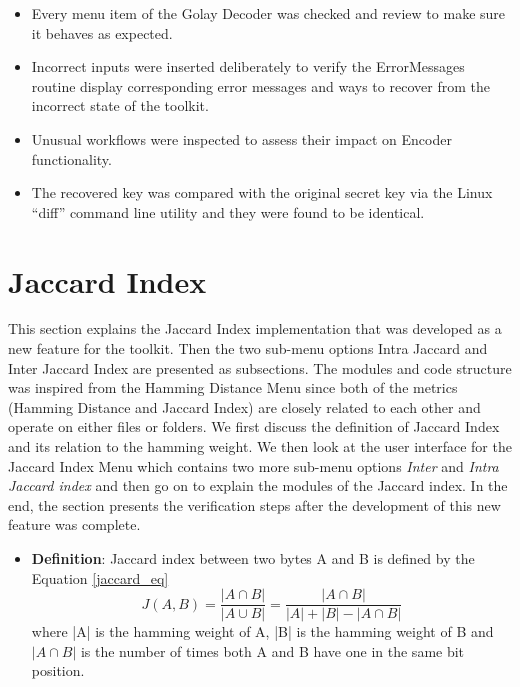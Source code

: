 	\begin{itemize}\itemsep-\the\parsep
		\item Every menu item of the Golay Decoder was checked and review to make sure it behaves as expected.
		\item Incorrect inputs were inserted deliberately to verify the ErrorMessages routine display corresponding error messages and ways to recover from the incorrect state of the toolkit.
		\item Unusual workflows were inspected to assess their impact on Encoder functionality.
		\item The recovered key was compared with the original secret key via the Linux ``diff'' command line utility and they were found to be identical.
	\end{itemize}

	\section{Jaccard Index}
	\label{jaccardi_index_section}
	This section explains the Jaccard Index implementation that was developed as a new feature for the toolkit. Then the two sub-menu options Intra Jaccard and Inter Jaccard Index are presented as subsections.
	The modules and code structure was inspired from the Hamming Distance Menu since both of the metrics (Hamming Distance and Jaccard Index) are closely related to each other and operate on either files or folders. We first discuss the definition of Jaccard Index and its relation to the hamming weight. We then look at the user interface for the Jaccard Index Menu which contains two more sub-menu options \emph{Inter} and \emph{Intra Jaccard index} and then go on to explain the modules of the
	Jaccard index. In the end, the section presents the verification steps after the development of this new feature was complete.\\

	\begin{itemize}
		\item \textbf{Definition}: Jaccard index between two bytes A and B is defined by the Equation \ref{jaccard_eq}
		\begin{equation}
		J(A,B) = \frac {|A \cap B|} {|A\cup B|} = \frac{|A \cap B|} {|A| + |B| - |A \cap B|}
		\label{jaccard_eq}
		\end{equation}
		where |A| is the hamming weight of A, |B| is the hamming weight of B and $|A \cap B|$ is the number of times both A and B have one in the same bit position.
	\end{itemize}

